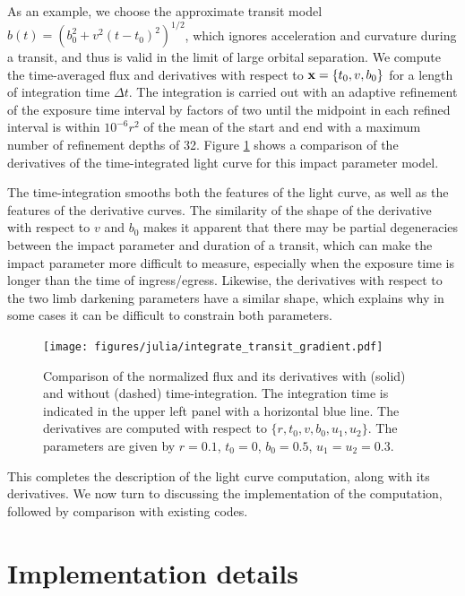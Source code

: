 \documentclass[modern]{aastex61}
\begin{document}
As an example, we choose the approximate transit model $b(t) = (b_0^2 + v^2(t-t_0)^2)^{1/2}$,
which ignores acceleration and curvature during a transit, and thus is valid in the
limit of large orbital separation.  We compute the time-averaged flux and derivatives 
with respect to ${\mathbf{x}} = \{t_0,v,b_0\}$ for a length of integration time $\Delta t$.
The integration is carried out with an adaptive refinement of the exposure time interval by
factors of two until the midpoint in each refined interval is within $10^{-6}r^2$
of the mean of the start and end with a maximum
number of refinement depths of 32.  Figure \ref{fig:integrated_derivs} shows a
comparison of the derivatives of the time-integrated light curve for this
impact parameter model.  

The time-integration smooths both the features of
the light curve, as well as the features of the derivative curves.  The similarity of
the shape of the derivative with respect to $v$ and $b_0$ makes it apparent
that there may be partial degeneracies between the impact parameter and duration
of a transit, which can make the impact parameter more difficult to measure, especially 
when the exposure time is longer than the time of ingress/egress.  Likewise, the
derivatives with respect to the two limb darkening parameters have a similar shape,
which explains why in some cases it can be difficult to constrain both parameters.

\begin{figure}
    \begin{centering}
    \texttt{[image: figures/julia/integrate\_transit\_gradient.pdf]}
    \caption{Comparison of the normalized flux and its derivatives with (solid) and
    without (dashed) time-integration.  The integration time is indicated in the
    upper left panel with a horizontal blue line. The derivatives are computed with
    respect to $\{r,t_0,v,b_0,u_1,u_2\}$.  The parameters are given by $r=0.1$,
    $t_0 = 0$, $b_0=0.5$, $u_1=u_2=0.3$. 
    \label{fig:integrated_derivs}}
    \end{centering}
\end{figure}

This completes the description of the light curve computation, along
with its derivatives.  We now turn to discussing the implementation of
the computation, followed by comparison with existing codes.

\section{Implementation details}
\end{document}
